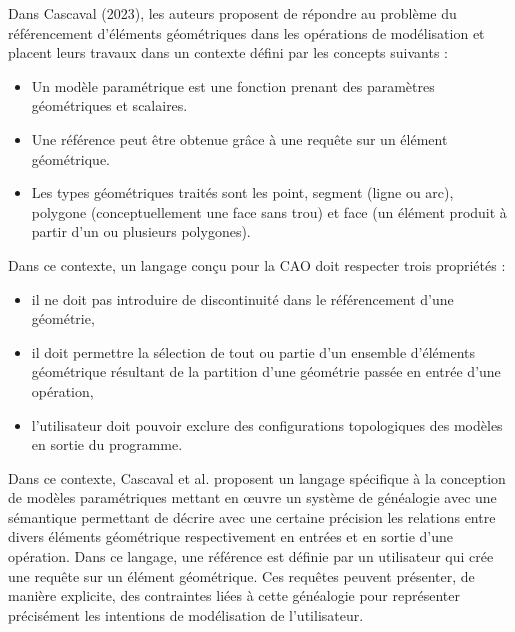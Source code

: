 \documentclass[11pt, a4paper]{article}
\author{}
\date{}
\title{}
\begin{document}

Dans Cascaval (2023), les auteurs proposent de répondre au problème du
référencement d'éléments géométriques dans les opérations de modélisation
et placent leurs travaux dans un contexte défini par les concepts suivants :
\begin{itemize}
	\item Un modèle paramétrique est une fonction prenant des paramètres
	      géométriques et scalaires.
	\item Une référence peut être obtenue grâce à une requête sur un élément
	      géométrique.
	\item Les types géométriques traités sont les point, segment (ligne ou
	      arc), polygone (conceptuellement une face sans trou) et face (un
	      élément produit à partir d'un ou plusieurs polygones).
\end{itemize}

Dans ce contexte, un langage conçu pour la CAO doit respecter trois propriétés :
\begin{itemize}
	\item il ne doit pas introduire de discontinuité dans le référencement d'une
	      géométrie,
	\item il doit permettre la sélection de tout ou partie d'un ensemble d'éléments
	      géométrique résultant de la partition d'une géométrie passée en entrée d'une
	      opération,
	\item l'utilisateur doit pouvoir exclure des configurations topologiques des modèles
	      en sortie du programme.
\end{itemize}


Dans ce contexte, Cascaval et al. proposent un langage spécifique à la
conception de modèles paramétriques mettant en œuvre un système de généalogie
avec une sémantique permettant de décrire avec une certaine précision les
relations entre divers éléments géométrique respectivement en entrées et en
sortie d'une opération. Dans ce langage, une référence est définie par un
utilisateur qui crée une requête sur un élément géométrique. Ces requêtes
peuvent présenter, de manière explicite, des contraintes liées à cette
généalogie pour représenter précisément les intentions de modélisation de
l'utilisateur.

\end{document}
